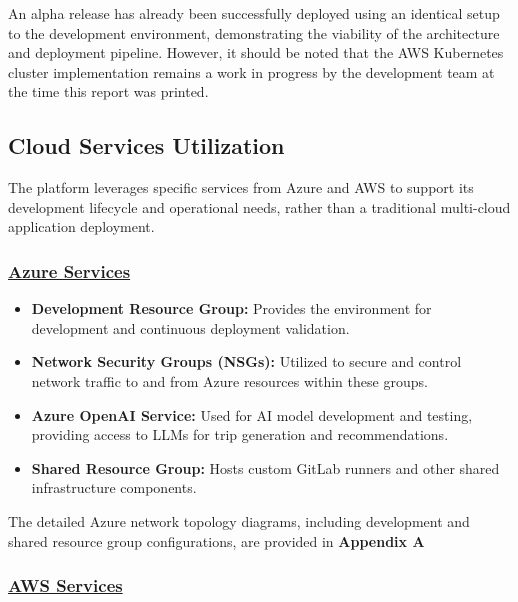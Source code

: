 An alpha release has already been successfully deployed using an identical setup to the development environment, demonstrating the viability of the architecture and deployment pipeline. However, it should be noted that the AWS Kubernetes cluster implementation remains a work in progress by the development team at the time this report was printed.

\subsection{Cloud Services Utilization}
The platform leverages specific services from Azure and AWS to support its development lifecycle and operational needs, rather than a traditional multi-cloud application deployment.

\subsubsection*{\underline{Azure Services}}

\begin{itemize}
    \item \textbf{Development Resource Group:} Provides the environment for development and continuous deployment validation.
    \item \textbf{Network Security Groups (NSGs):} Utilized to secure and control network traffic to and from Azure resources within these groups.
    \item \textbf{Azure OpenAI Service:} Used for AI model development and testing, providing access to LLMs for trip generation and recommendations.
    \item \textbf{Shared Resource Group:} Hosts custom GitLab runners and other shared infrastructure components.
\end{itemize}

The detailed Azure network topology diagrams, including development and shared resource group configurations, are provided in \textbf{Appendix A}

\subsubsection*{\underline{AWS Services}}

